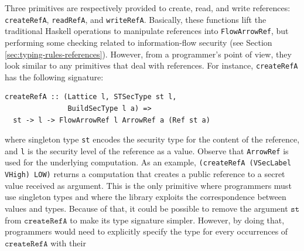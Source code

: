 \documentclass[times, 10pt,twocolumn]{article}
\begin{document}
Three primitives are  respectively provided to create, read, and 
write references:
\texttt{createRefA}, \texttt{readRefA}, 
and \texttt{writeRefA}. 
Basically, 
these functions lift the traditional Haskell operations to manipulate references into 
\texttt{FlowArrowRef}, but performing some checking related to
information-flow security (see Section
\ref{sec:typing-rules-references}). However, from a programmer's point
of view, they look similar to any primitives that deal with
references. For instance, \texttt{createRefA} has the following signature:
\begin{Verbatim}[fontsize=\footnotesize]
createRefA :: (Lattice l, STSecType st l, 
               BuildSecType l a) =>
  st -> l -> FlowArrowRef l ArrowRef a (Ref st a)
\end{Verbatim}
where singleton type \texttt{st} encodes the security type for the content of the
reference, and \texttt{l} is the security level of the reference as
a value. Observe 
that \texttt{ArrowRef} is used for the underlying computation. 
As an example, \texttt{(createRefA (VSecLabel VHigh) LOW)}
returns a computation that creates a public reference to a
secret value received as argument. This is the only primitive
where programmers must use singleton types 
and where the library 
exploits the correspondence between values and types. 
Because of that, it could be possible to remove the argument $\texttt{st}$ from
$\texttt{createRefA}$ to make its type signature simpler. 
However, by doing that, programmers would need to 
explicitly specify the type for every occurrences of
$\texttt{createRefA}$ with their 
\end{document}
